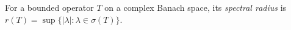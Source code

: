 
For a bounded operator $T$ on a complex Banach space, its \emph{spectral radius} is $r(T)=\sup\{|\lambda|:\lambda\in\sigma(T)\}$.
